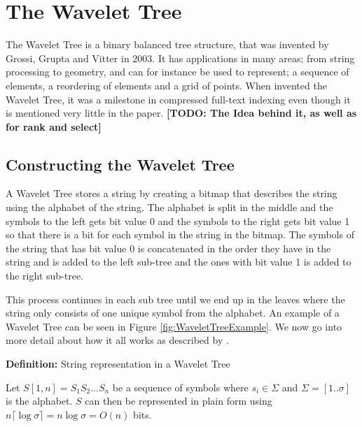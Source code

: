 \section{The Wavelet Tree}
The Wavelet Tree is a binary balanced tree structure, that was invented by Grossi, Grupta and Vitter \citep{Grossi:2003:HET:644108.644250} in 2003. 
It has applications in many areas; from string processing to geometry, and can for instance be used to represent; a sequence of elements, a reordering of elements and a grid of points. 
When \citep{Grossi:2003:HET:644108.644250} invented the Wavelet Tree, it was a milestone in compressed full-text indexing even though it is mentioned very little in the paper.
\textbf{[TODO: The Idea behind it, as well as for rank and select]}

\subsection{Constructing the Wavelet Tree}
A Wavelet Tree stores a string by creating a bitmap that describes the string using the alphabet of the string. The alphabet is split in the middle and the symbols to the left gets bit value 0 and the symbols to the right gets bit value 1 so that there is a bit for each symbol in the string in the bitmap. 
The symbols of the string that has bit value 0 is concatenated in the order they have in the string and is added to the left sub-tree and the ones with bit value 1 is added to the right sub-tree. 

This process continues in each sub tree until we end up in the leaves where the string only consists of one unique symbol from the alphabet. 
An example of a Wavelet Tree can be seen in Figure \ref{fig:WaveletTreeExample}. 
We now go into more detail about how it all works as described by \citep{Navjda13}.

\vspace{0.5 cm}
\begin{mdframed}[nobreak]
\textbf{Definition:} String representation in a Wavelet Tree

Let $S[1,n] = S_1 S_2 ... S_n$ be a sequence of symbols where $s_i \in \Sigma$ and $\Sigma = [1 .. \sigma]$ is the alphabet. $S$ can then be represented in plain form using $n \lceil \log \sigma \rceil = n \log \sigma = O(n)$ bits.
\end{mdframed}
\vspace{0.5 cm}


